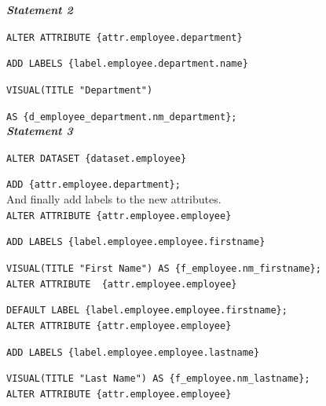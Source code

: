 \documentclass[a4paper, 12pt, titlepage, fleqn]{article}
\begin{document}
\textbf{\emph{Statement 2}}  

\hspace{.9cm}\verb=ALTER ATTRIBUTE {attr.employee.department}=

\hspace{.9cm}\verb=ADD LABELS {label.employee.department.name} =

\hspace{.9cm}\verb=VISUAL(TITLE "Department")=

\hspace{.9cm}\verb=AS {d_employee_department.nm_department};=\\

\textbf{\emph{Statement 3}}  

\hspace{.9cm}\verb=ALTER DATASET {dataset.employee}=

\hspace{.9cm}\verb=ADD {attr.employee.department};=\\

And finally add labels to the new attributes.\\

\hspace{.9cm}\verb=ALTER ATTRIBUTE {attr.employee.employee}=

\hspace{.9cm}\verb=ADD LABELS {label.employee.employee.firstname}=

\hspace{.9cm}\verb=VISUAL(TITLE "First Name") AS {f_employee.nm_firstname};=\\

\hspace{.9cm}\verb=ALTER ATTRIBUTE  {attr.employee.employee}=

\hspace{.9cm}\verb=DEFAULT LABEL {label.employee.employee.firstname};=\\

\hspace{.9cm}\verb=ALTER ATTRIBUTE {attr.employee.employee}=

\hspace{.9cm}\verb=ADD LABELS {label.employee.employee.lastname}=

\hspace{.9cm}\verb=VISUAL(TITLE "Last Name") AS {f_employee.nm_lastname};=\\

\hspace{.9cm}\verb=ALTER ATTRIBUTE {attr.employee.employee}=
\end{document}
